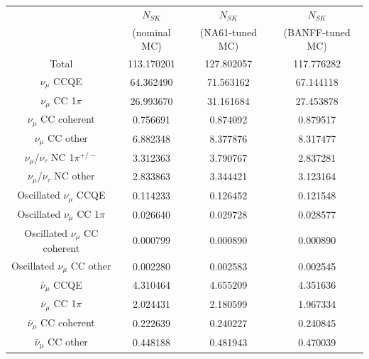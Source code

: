 \begin{table}
\centering
\begin{tabular}{| c | c | c | c | }
\hline
                                                     & $N_{SK}$     & $N_{SK}$         & $N_{SK}$          \\
                                                     & (nominal MC) & (NA61-tuned MC)  & (BANFF-tuned MC)  \\
\hline
Total                                                & 113.170201   & 127.802057       & 117.776282 \\
\hline
$\nu_\mu$ CCQE                                       &  64.362490   &  71.563162       &  67.144118 \\
$\nu_\mu$ CC 1$\pi$                                  &  26.993670   &  31.161684       &  27.453878 \\
$\nu_\mu$ CC coherent                                &   0.756691   &   0.874092       &   0.879517 \\
$\nu_\mu$ CC other                                   &   6.882348   &   8.377876       &   8.317477 \\
$\nu_\mu$/$\nu_\tau$ NC 1$\pi^{+/-}$                 &   3.312363   &   3.790767       &   2.837281 \\
$\nu_\mu$/$\nu_\tau$ NC other                        &   2.833863   &   3.344421       &   3.123164 \\
Oscillated $\nu_\mu$ CCQE                            &   0.114233   &   0.126452       &   0.121548 \\
Oscillated $\nu_\mu$ CC 1$\pi$                       &   0.026640   &   0.029728       &   0.028577 \\
Oscillated $\nu_\mu$ CC coherent                     &   0.000799   &   0.000890       &   0.000890 \\
Oscillated $\nu_\mu$ CC other                        &   0.002280   &   0.002583       &   0.002545 \\
$\bar{\nu}_{\mu}$ CCQE                               &   4.310464   &   4.655209       &   4.351636 \\
$\bar{\nu}_{\mu}$ CC 1$\pi$                          &   2.024431   &   2.180599       &   1.967334 \\
$\bar{\nu}_{\mu}$ CC coherent                        &   0.222639   &   0.240227       &   0.240845 \\
$\bar{\nu}_{\mu}$ CC other                           &   0.448188   &   0.481943       &   0.470039 \\

\end{tabular}
\end{table}

